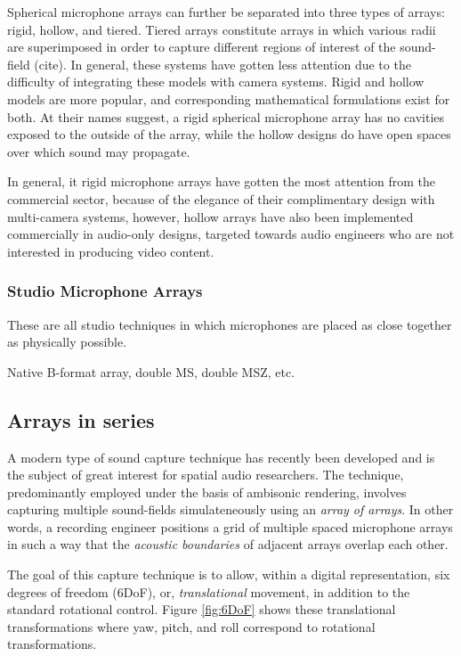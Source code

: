 Spherical microphone arrays can further be separated into three types of arrays: rigid, hollow, and tiered. Tiered arrays constitute arrays in which various radii are superimposed in order to capture different regions of interest of the sound-field (cite). In general, these systems have gotten less attention due to the difficulty of integrating these models with camera systems. Rigid and hollow models are more popular, and corresponding mathematical formulations exist for both. At their names suggest, a rigid spherical microphone array has no cavities exposed to the outside of the array, while the hollow designs do have open spaces over which sound may propagate.

In general, it rigid microphone arrays have gotten the most attention from the commercial sector, because of the elegance of their complimentary design with multi-camera systems, however, hollow arrays have also been implemented commercially in audio-only designs, targeted towards audio engineers who are not interested in producing video content. 

\subsubsection{Studio Microphone Arrays}
These are all studio techniques in which microphones are placed as close together as physically possible. 

Native B-format array, double MS, double MSZ, etc.

\subsection{Arrays in series}
A modern type of sound capture technique has recently been developed and is the subject of great interest for spatial audio researchers. The technique, predominantly employed under the basis of ambisonic rendering, involves capturing multiple sound-fields simulateneously using an \textit{array of arrays}. In other words, a recording engineer positions a grid of multiple spaced microphone arrays in such a way that the \textit{acoustic boundaries} of adjacent arrays overlap each other. 

The goal of this capture technique is to allow, within a digital representation, six degrees of freedom (6DoF), or, \textit{translational} movement, in addition to the standard rotational control. Figure \ref{fig:6DoF} shows these translational transformations where yaw, pitch, and roll correspond to rotational transformations. 

